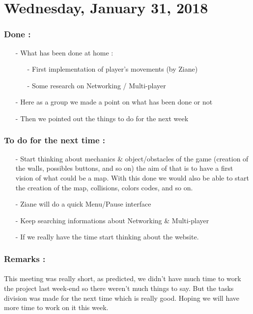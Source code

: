 \documentclass[12pt]{article}
\begin{document}
\section*{Wednesday, January 31, 2018}
	\subsubsection*{Done :}
      \begin{itemize}
        \item[-] What has been done at home :
        \begin{itemize}
        	\item[-] First implementation of player's movements (by Ziane)
        	\item[-] Some research on Networking / Multi-player
      	\end{itemize}
        \item[-] Here as a group we made a point on what has been done or not
        \item[-] Then we pointed out the things to do for the next week
      \end{itemize}
    
    \subsubsection*{To do for the next time :}
      \begin{itemize}
        \item[-] Start thinking about mechanics \& object/obstacles of the game (creation of the walls, possibles buttons, and so on) the aim of that is to have a first vision of what could be a map. With this done we would also be able to start the creation of the map, collisions, colors codes, and so on.
        \item[-] Ziane will do a quick Menu/Pause interface
        \item[-] Keep searching informations about Networking \& Multi-player
        \item[-] If we really have the time start thinking about the website.
      \end{itemize}
    
	\subsubsection*{Remarks :}
		\paragraph{} This meeting was really short, as predicted, we didn't have much time to work the project last week-end so there weren't much things to say. But the tasks division was made for the next time which is really good. Hoping we will have more time to work on it this week.
\newpage
\end{document}
